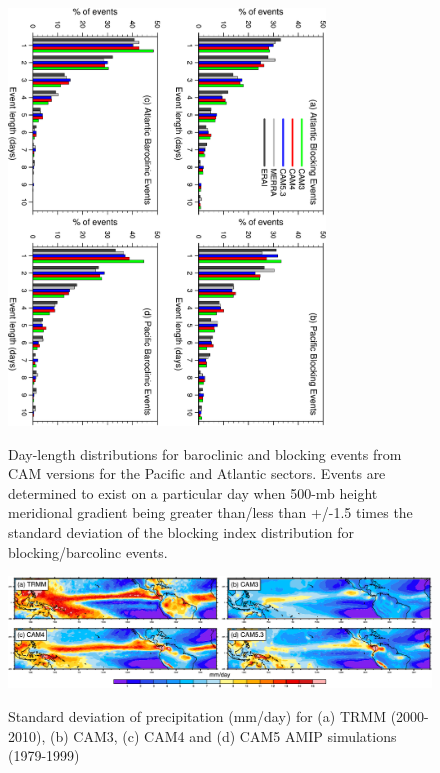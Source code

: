 \documentclass[12pt,varwidth]{article}
\begin{document}
\begin{figure}[t]
  \begin{center}
    \noindent\includegraphics[width=0.75\textwidth,angle=90.]{./figs/f_event_len.pdf}\\
  \end{center}
  \caption{Day-length distributions for baroclinic and blocking events from CAM versions for the Pacific and Atlantic sectors. Events are determined to exist on a particular day when 500-mb height meridional gradient being greater than/less than +/-1.5 times the standard deviation of the blocking index distribution for blocking/barcolinc events.} 
\label{f_event_len}
\end{figure}

\begin{figure}[t]
  \begin{center}
    \noindent\includegraphics[width=1.0\textwidth,angle=0.]{./figs/f_precip_std.pdf}\\
  \end{center}
  \caption{Standard deviation of precipitation (mm/day) for (a) TRMM (2000-2010), (b) CAM3, (c) CAM4 and (d) CAM5 AMIP simulations (1979-1999)} 
\label{f_precip_std}
\end{figure}
\end{document}
